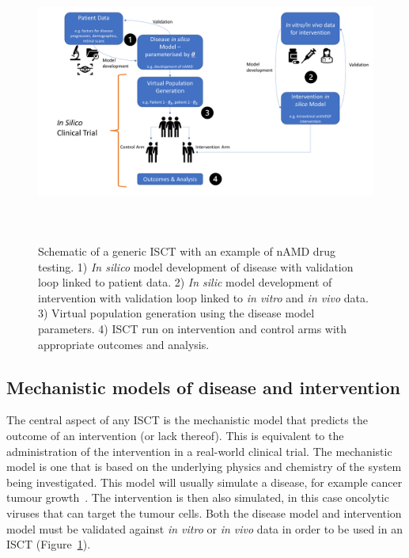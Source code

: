 \documentclass{article}
\begin{document}
\begin{figure}[t!]
  \centering
  \includegraphics[width=1\textwidth, height=9.3cm]{Fig_sec_8.png}
  \hfill
  \caption{Schematic of a generic ISCT with an example of nAMD drug testing. 1) \textit{In silico} model development of disease with validation loop linked to patient data. 2) \textit{In silic} model development of intervention with validation loop linked to \textit{in vitro} and \textit{in vivo} data. 3) Virtual population generation using the disease model parameters. 4) ISCT run on intervention and control arms with appropriate outcomes and analysis.}
  \label{fig:ISCT}
\end{figure}

\subsection{Mechanistic models of disease and intervention}

The central aspect of any ISCT is the mechanistic model that predicts the outcome of an intervention (or lack thereof). This is equivalent to the administration of the intervention in a real-world clinical trial. The mechanistic model is one that is based on the underlying physics and chemistry of the system being investigated. This model will usually simulate a disease, for example cancer tumour growth~\cite{Jenner2021}. The intervention is then also simulated, in this case oncolytic viruses that can target the tumour cells. Both the disease model and intervention model must be validated against \textit{in vitro} or \textit{in vivo} data in order to be used in an ISCT (Figure~\ref{fig:ISCT}).
\end{document}
